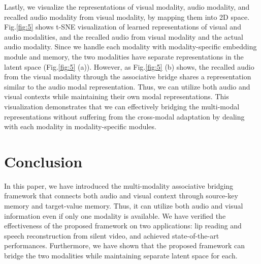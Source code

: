 \documentclass[10pt,twocolumn,letterpaper]{article}
\begin{document}
Lastly, we visualize the representations of visual modality, audio modality, and recalled audio modality from visual modality, by mapping them into 2D space. Fig.\ref{fig:5} shows t-SNE \cite{van2008tsne} visualization of learned representations of visual and audio modalities, and the recalled audio from visual modality and the actual audio modality. Since we handle each modality with modality-specific embedding module and memory, the two modalities have separate representations in the latent space (Fig.\ref{fig:5} (a)). However, as Fig.\ref{fig:5} (b) shows, the recalled audio from the visual modality through the associative bridge shares a representation similar to the audio modal representation. Thus, we can utilize both audio and visual contexts while maintaining their own modal representations. This visualization demonstrates that we can effectively bridging the multi-modal representations without suffering from the cross-modal adaptation by dealing with each modality in modality-specific modules.

\section{Conclusion}
In this paper, we have introduced the multi-modality associative bridging framework that connects both audio and visual context through source-key memory and target-value memory. Thus, it can utilize both audio and visual information even if only one modality is available. We have verified the effectiveness of the proposed framework on two applications: lip reading and speech reconstruction from silent video, and achieved state-of-the-art performances. Furthermore, we have shown that the proposed framework can bridge the two modalities while maintaining separate latent space for each.

{\small


}
\end{document}
